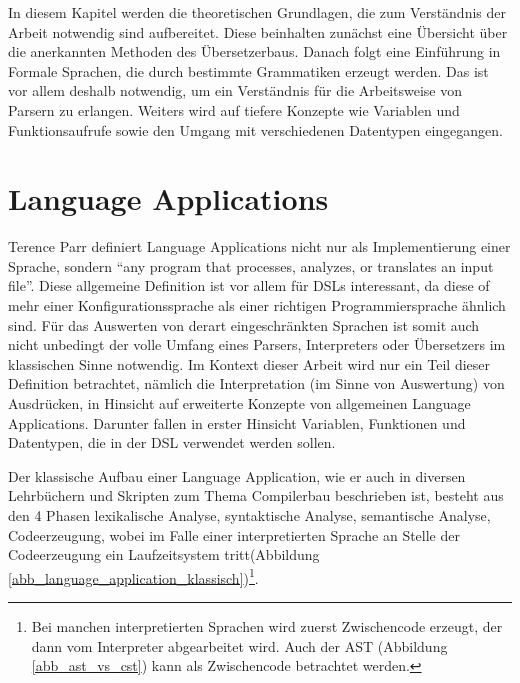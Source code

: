 \label{chapter_theoretische_grundlagen}

In diesem Kapitel werden die theoretischen Grundlagen, die zum Verständnis der Arbeit notwendig sind aufbereitet. Diese beinhalten zunächst eine Übersicht über die anerkannten Methoden des Übersetzerbaus. Danach folgt eine Einführung in Formale Sprachen, die durch bestimmte Grammatiken erzeugt werden. Das ist vor allem deshalb notwendig, um ein Verständnis für die Arbeitsweise von Parsern zu erlangen. Weiters wird auf tiefere Konzepte wie Variablen und Funktionsaufrufe sowie den Umgang mit verschiedenen Datentypen eingegangen.


\section{Language Applications}
\label{theorie_language_applications}

Terence Parr definiert Language Applications nicht nur als Implementierung einer Sprache, sondern ``any program that processes, analyzes, or translates an input file''\cite{Parr10}. Diese allgemeine Definition ist vor allem für DSLs interessant, da diese of mehr  einer Konfigurationssprache als einer richtigen Programmiersprache ähnlich sind. Für das Auswerten von derart eingeschränkten Sprachen ist somit auch nicht unbedingt der volle Umfang eines Parsers, Interpreters oder Übersetzers im klassischen Sinne notwendig. Im Kontext dieser Arbeit wird nur ein Teil dieser Definition betrachtet, nämlich die Interpretation (im Sinne von Auswertung) von Ausdrücken, in Hinsicht auf erweiterte Konzepte von allgemeinen Language Applications. Darunter fallen in erster Hinsicht Variablen, Funktionen und Datentypen, die in der DSL verwendet werden sollen.

Der klassische Aufbau einer Language Application, wie er auch in diversen Lehrbüchern und Skripten zum Thema Compilerbau beschrieben ist, besteht aus den 4 Phasen lexikalische Analyse, syntaktische Analyse, semantische Analyse, Codeerzeugung, wobei im Falle einer interpretierten Sprache an Stelle der Codeerzeugung ein Laufzeitsystem tritt(Abbildung \ref{abb_language_application_klassisch})\footnote{Bei manchen interpretierten Sprachen wird zuerst Zwischencode erzeugt, der dann vom Interpreter abgearbeitet wird. Auch der AST (Abbildung \ref{abb_ast_vs_cst}) kann als Zwischencode betrachtet werden.}.


